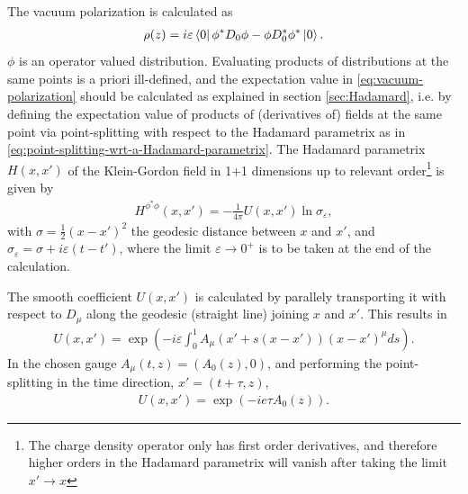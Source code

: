 		The vacuum polarization is calculated as
		\begin{align}
			\rho(z) = i\varepsilon \bra{0} \phi^* D_0\phi - \phi D_0^* \phi^* \ket{0}.
			\label{eq:vacuum-polarization}
		\end{align}
		$\phi$ is an operator valued distribution.
		Evaluating products of distributions at the same points is a priori ill-defined, and the expectation value in \eqref{eq:vacuum-polarization}  should be calculated as explained in section \ref{sec:Hadamard}, i.e. by defining the expectation value of products of (derivatives of) fields at the same point via point-splitting with respect to the Hadamard parametrix as in \eqref{eq:point-splitting-wrt-a-Hadamard-parametrix}.
		The Hadamard parametrix $H(x, x') $ of the Klein-Gordon field in 1+1 dimensions up to relevant order\footnote{The charge density operator only has first order derivatives, and therefore higher orders in the Hadamard parametrix will vanish after taking the limit $x'\to x$ } is given by
		\begin{align}
			H^{\phi^* \phi}(x, x') = -\frac{1}{4\pi}U(x, x') \ln \sigma_\varepsilon,
		\end{align}
	with $\sigma = \frac{1}{2}(x - x')^2$ the geodesic distance between $x$ and $x'$, and $\sigma_\varepsilon = \sigma + i \varepsilon (t-t')$, where the limit $\varepsilon\to 0^+$ is to be taken at the end of the calculation.

	The smooth coefficient $U(x, x')$  is calculated by parallely transporting it with respect to $D_\mu$ along the geodesic (straight line) joining $x$ and $x'$. This results in 
	\begin{align}
		U(x, x') = \exp \left( -i\varepsilon \int_{0}^{1} A_\mu(x' + s(x-x')) \left( x- x' \right) ^{ \mu} ds  \right) .
	\end{align}
	In the chosen gauge $A_\mu(t, z) = (A_0(z), 0)$, and performing the point-splitting in the time direction, $x' =  (t+\tau, z)$, 
	\begin{align}
	U(x, x') = \exp\left( -ie\tau A_0(z) \right).
	\end{align}

